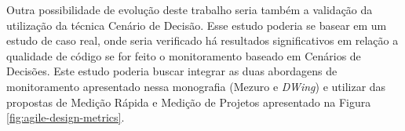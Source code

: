 Outra possibilidade de evolução deste trabalho seria também a validação da utilização da técnica Cenário de Decisão. Esse estudo poderia se basear em um estudo de caso real, onde seria verificado há resultados significativos em relação a qualidade de código se for feito o monitoramento baseado em Cenários de Decisões. Este estudo poderia buscar integrar as duas abordagens de monitoramento apresentado nessa monografia (Mezuro e \emph{DWing}) e utilizar das propostas de Medição Rápida e Medição de Projetos apresentado na Figura \ref{fig:agile-design-metrics}.

%


%


